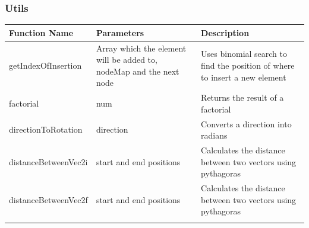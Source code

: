 \documentclass[../Main.tex]{subfiles}
\begin{document}
        \subsubsection{Utils}
        \begin{center}
            \begin{tabular}{ | m{} | m{}| m{} | }
                \hline
                \textbf{Function Name} & \textbf{Parameters} & \textbf{Description} \\
                \hline
                getIndexOfInsertion & Array which the element will be added to, nodeMap and the next node & Uses binomial search to find the position of where to insert a new element \\
                \hline
                factorial & num & Returns the result of a factorial \\
                \hline
                directionToRotation & direction & Converts a direction into radians \\
                \hline
                distanceBetweenVec2i & start and end positions & Calculates the distance between two vectors using pythagoras \\
                \hline
                distanceBetweenVec2f & start and end positions &  Calculates the distance between two vectors using pythagoras\\
                \hline
                & & \\
                \hline
            \end{tabular}
        \end{center}
\end{document}
